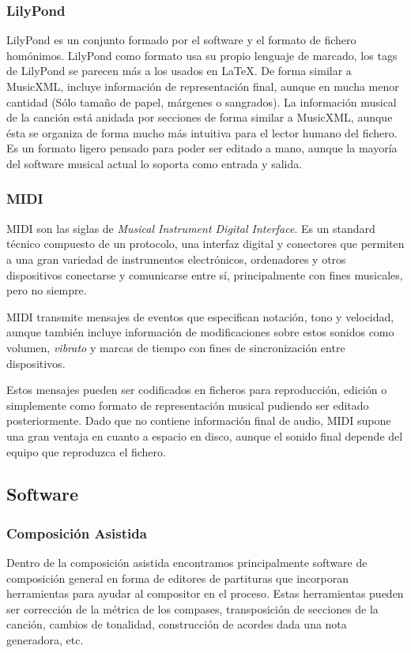 \subsubsection{LilyPond}
LilyPond es un conjunto formado por el software y el formato de fichero homónimos. LilyPond como formato usa su propio lenguaje de marcado, los tags de LilyPond se parecen más a los usados en \LaTeX. De forma similar a MusicXML, incluye información de representación final, aunque en mucha menor cantidad (Sólo tamaño de papel, márgenes o sangrados). La información musical de la canción está anidada por secciones de forma similar a MusicXML, aunque ésta se organiza de forma mucho más intuitiva para el lector humano del fichero. Es un formato ligero pensado para poder ser editado a mano, aunque la mayoría del software musical actual lo soporta como entrada y salida. 

\subsubsection{MIDI}
MIDI son las siglas de \textit{Musical Instrument Digital Interface}. Es un standard técnico compuesto de un protocolo, una interfaz digital y conectores que permiten a una gran variedad de instrumentos electrónicos, ordenadores y otros dispositivos conectarse y comunicarse entre sí, principalmente con fines musicales, pero no siempre.

MIDI transmite mensajes de eventos que especifican notación, tono y velocidad, aunque también incluye información de modificaciones sobre estos sonidos como volumen, \textit{vibrato} y marcas de tiempo con fines de sincronización entre dispositivos. 

Estos mensajes pueden ser codificados en ficheros para reproducción, edición o simplemente como formato de representación musical pudiendo ser editado posteriormente. Dado que no contiene información final de audio, MIDI supone una gran ventaja en cuanto a espacio en disco, aunque el sonido final depende del equipo que reproduzca el fichero.


\subsection{Software}
\subsubsection{Composición Asistida}
Dentro de la composición asistida encontramos principalmente software de composición general en forma de editores de partituras que incorporan herramientas para ayudar al compositor en el proceso. Estas herramientas pueden ser corrección de la métrica de los compases, transposición de secciones de la canción, cambios de tonalidad, construcción de acordes dada una nota generadora, etc.

